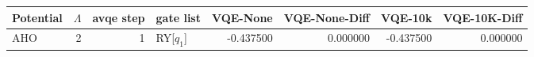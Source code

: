 \begin{tabular}{lrrlrrrr}
\toprule
Potential & $\Lambda$ & avqe step & gate list & VQE-None & VQE-None-Diff & VQE-10k & VQE-10K-Diff \\
\midrule
AHO & 2 & 1 & RY[$q_1$] & -0.437500 & 0.000000 & -0.437500 & 0.000000 \\
\bottomrule
\end{tabular}
